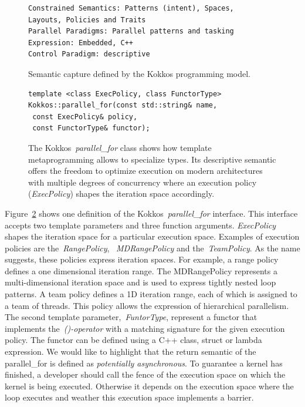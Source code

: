\begin{figure}[h]
\begin{Verbatim}[frame=leftline]
Constrained Semantics: Patterns (intent), Spaces, 
Layouts, Policies and Traits
Parallel Paradigms: Parallel patterns and tasking
Expression: Embedded, C++
Control Paradigm: descriptive
\end{Verbatim}
\caption{Semantic capture defined by the Kokkos programming model.}
\label{fig:SemCaptureKokkos}
\end{figure}

\begin{figure}
\begin{Verbatim}[frame=leftline]
template <class ExecPolicy, class FunctorType>
Kokkos::parallel_for(const std::string& name, 
 const ExecPolicy& policy, 
 const FunctorType& functor);
\end{Verbatim}
\caption{The Kokkos~\emph{parallel\_for} class shows how template metaprogramming allows to specialize types. Its descriptive semantic offers the freedom to optimize execution on modern architectures with multiple degrees of concurrency where an execution policy (\emph{ExecPolicy}) shapes the iteration space accordingly.}
\label{fig:parallelFor}
\end{figure}

Figure~\ref{fig:parallelFor} shows one definition of the Kokkos~\emph{parallel\_for} interface. This interface accepts two template parameters and three function arguments. \emph{ExecPolicy} shapes the iteration space for a particular execution space. Examples of execution policies are the~\emph{RangePolicy}, ~\emph{MDRangePolicy} and the~\emph{TeamPolicy}. As the name suggests, these policies express iteration spaces. For example, a range policy defines a one dimensional iteration range. The MDRangePolicy represents a multi-dimensional iteration space and is used to express tightly nested loop patterns. A team policy defines a 1D iteration range, each of which is assigned to a team of threads. This policy allows the expression of hierarchical parallelism. The second template parameter,~\emph{FuntorType}, represent a functor that implements the~\emph{()-operator} with a matching signature for the given execution policy. The functor can be defined using a C++ class, struct or lambda expression. We would like to highlight that the return semantic of the parallel\_for is defined as \emph{potentially asynchronous}. To guarantee a kernel has finished, a developer should call the fence of the execution space on which the kernel is being executed. Otherwise it depends on the execution space where the loop executes and weather this execution space implements a barrier. 


